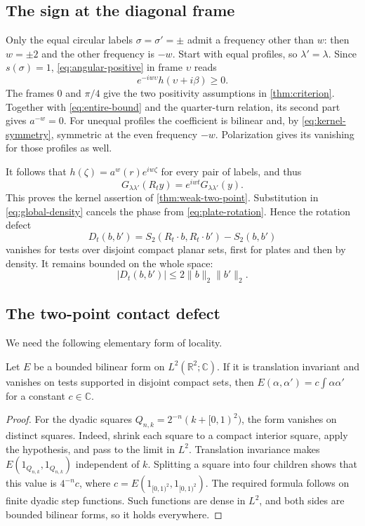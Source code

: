 \documentclass[11pt,letterpaper,reqno]{amsart}
\makeatletter
\theoremstyle{definition}
\newcommand{\ms@minorstart}{%
  \pushQED{\qed}\renewcommand{\qedsymbol}{$\blacksquare$}}
\newenvironment{lemma}[1][]{\ms@minorstart\ms@lemma[#1]}
  {\popQED\endms@lemma}
\theoremstyle{remark}
\newcommand{\R}{\mathbb R}\newcommand{\C}{\mathbb C}
\makeatother
\begin{document}
\subsection{The sign at the diagonal frame}

Only the equal circular labels $\sigma=\sigma'=\pm$ admit a
frequency other than $w$: then $w=\pm2$ and the other frequency
is $-w$. Start with equal profiles, so $\lambda'=\lambda$.
Since $s(\sigma)=1$, \eqref{eq:angular-positive} in frame $\upsilon$
reads
\[
 e^{-iw\upsilon}h(\upsilon+i\beta)\ge0.
\]
The frames $0$ and $\pi/4$ give the two positivity assumptions in
\cref{thm:criterion}. Together with \eqref{eq:entire-bound} and the
quarter-turn relation, its second part gives $a^{-w}=0$.
For unequal profiles the coefficient is bilinear and, by
\eqref{eq:kernel-symmetry}, symmetric at the even frequency $-w$.
Polarization gives its vanishing for those profiles as well.

It follows that $h(\zeta)=a^w(r)e^{iw\zeta}$ for every pair of labels,
and thus
\begin{equation}\label{eq:two-covariance}
 G_{\lambda\lambda'}(R_ty)=e^{iwt}G_{\lambda\lambda'}(y).
\end{equation}
This proves the kernel assertion of \cref{thm:weak-two-point}.
Substitution in \eqref{eq:global-density} cancels the phase from
\eqref{eq:plate-rotation}. Hence the rotation defect
\[
 D_t(b,b')=S_2(R_t\cdot b,R_t\cdot b')-S_2(b,b')
\]
vanishes for tests over disjoint compact planar sets, first for plates
and then by density. It remains bounded on the whole space:
\begin{equation}\label{eq:two-defect-bound}
 |D_t(b,b')|\le2\|b\|_2\|b'\|_2.
\end{equation}

\subsection{The two-point contact defect}

We need the following elementary form of locality.

\begin{lemma}\label{lem:local-constant}
Let $E$ be a bounded bilinear form on $L^2(\R^2;\C)$. If it is
translation invariant and vanishes on tests supported in disjoint
compact sets, then $E(\alpha,\alpha')=c\int\alpha\alpha'$ for a
constant $c\in\C$.
\end{lemma}

\begin{proof}
For the dyadic squares $Q_{n,k}=2^{-n}(k+[0,1)^2)$, the form vanishes
on distinct squares. Indeed, shrink each square to a compact interior
square, apply the hypothesis, and pass to the limit in $L^2$.
Translation invariance makes $E(1_{Q_{n,k}},1_{Q_{n,k}})$ independent
of $k$. Splitting a square into four children shows that this value
is $4^{-n}c$, where $c=E(1_{[0,1)^2},1_{[0,1)^2})$.
The required formula follows on finite dyadic step functions.
Such functions are dense in $L^2$, and both sides are bounded
bilinear forms, so it holds everywhere.
\end{proof}
\end{document}

